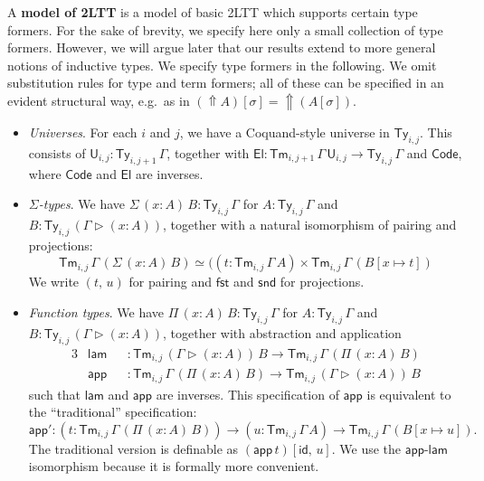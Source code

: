 \documentclass[acmsmall,anonymous,review]{acmart}
\newcommand{\msf}[1]{\mathsf{#1}}
\newcommand{\ext}{\triangleright}
\newcommand{\Code}{\msf{Code}}
\newcommand{\El}{\msf{El}}
\newcommand{\lam}{\msf{lam}}
\newcommand{\app}{\msf{app}}
\newcommand{\Lift}{{\Uparrow}}
\renewcommand{\U}{\msf{U}}
\newcommand{\Ty}{\msf{Ty}}
\newcommand{\Tm}{\msf{Tm}}
\newcommand{\fst}{\msf{fst}}
\newcommand{\snd}{\msf{snd}}
\newcommand{\id}{\msf{id}}
\theoremstyle{remark}
\begin{document}
\begin{definition}
A \textbf{model of 2LTT} is a model of basic 2LTT which supports certain type
formers. For the sake of brevity, we specify here only a small collection of
type formers. However, we will argue later that our results extend to more
general notions of inductive types. We specify type formers in the following. We
omit substitution rules for type and term formers; all of these can be specified in
an evident structural way, e.g.\ as in $(\Lift A)[\sigma] = \Lift(A[\sigma])$.
\begin{itemize}
\item \emph{Universes}. For each $i$ and $j$, we have a Coquand-style universe
  \cite{coquand2018canonicity} in $\Ty_{i,j}$. This consists of $\U_{i,j} : \Ty_{i,j+1}\,\Gamma$,
  together with $\El : \Tm_{i,j+1}\,\Gamma\,\U_{i,j} \to \Ty_{i,j}\,\Gamma$ and $\Code$, where $\Code$
  and $\El$ are inverses.
\item \emph{$\Sigma$-types}. We have $\Sigma\,(x : A)\,B : \Ty_{i,j}\,\Gamma$ for $A : \Ty_{i,j}\,\Gamma$
  and $B : \Ty_{i,j}\,(\Gamma \ext (x : A))$, together with a natural isomorphism of pairing and projections:
  \[ \Tm_{i,j}\,\Gamma\,(\Sigma\,(x : A)\,B) \simeq ((t : \Tm_{i,j}\,\Gamma\,A) \times \Tm_{i,j}\,\Gamma\,(B[x\mapsto t]) \]
  We write $(t,\,u)$ for pairing and $\fst$ and $\snd$ for projections.
\item \emph{Function types}.
  We have $\Pi\,(x : A)\,B : \Ty_{i,j}\,\Gamma$ for $A : \Ty_{i,j}\,\Gamma$ and
  $B : \Ty_{i,j}\,(\Gamma \ext (x : A))$, together with abstraction and application
  \begin{alignat*}{3}
    & \lam &&: \Tm_{i,j}\,(\Gamma \ext (x : A))\,B \to \Tm_{i,j}\,\Gamma\,(\Pi\,(x : A)\,B) \\
    & \app &&: \Tm_{i,j}\,\Gamma\,(\Pi\,(x : A)\,B) \to \Tm_{i,j}\,(\Gamma \ext (x : A))\,B
  \end{alignat*}
  such that $\lam$ and $\app$ are inverses. This specification of $\app$ is
  equivalent to the ``traditional'' specification:
  \[ \app' : (t : \Tm_{i,j}\,\Gamma\,(\Pi\,(x :
  A)\,B))\to (u : \Tm_{i,j}\,\Gamma\,A) \to \Tm_{i,j}\,\Gamma\,(B[x \mapsto
    u]).\]
  The traditional version is definable as $(\app\,t)[\id,\,u]$. We use
  the $\app$-$\lam$ isomorphism because it is formally more convenient.


\end{itemize}
\end{definition}
\end{document}
